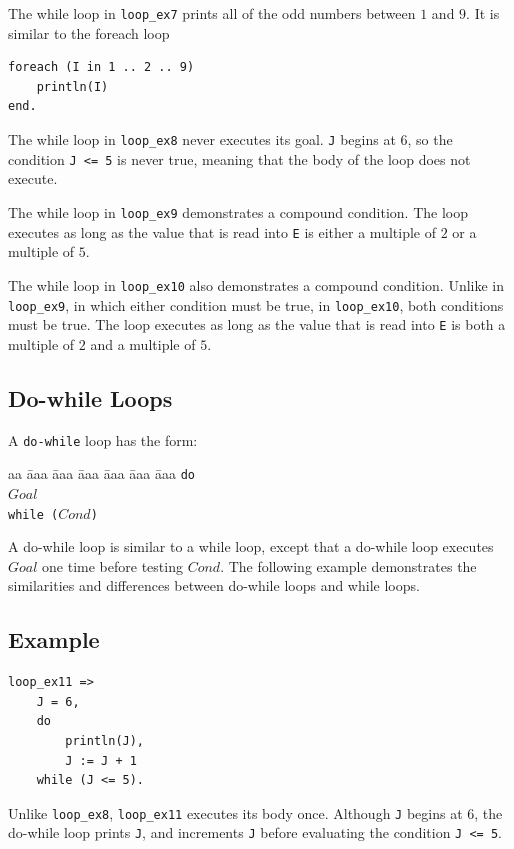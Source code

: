The while loop in \texttt{loop\_ex7} prints all of the odd numbers between $1$ and $9$.  It is similar to the foreach loop
\begin{verbatim}
foreach (I in 1 .. 2 .. 9)
    println(I)
end.
\end{verbatim}

The while loop in \texttt{loop\_ex8} never executes its goal.  \texttt{J} begins at $6$, so the condition \texttt{J <= 5} is never true, meaning that the body of the loop does not execute.

The while loop in \texttt{loop\_ex9} demonstrates a compound condition.  The loop executes as long as the value that is read into \texttt{E} is either a multiple of $2$ or a multiple of $5$.

The while loop in \texttt{loop\_ex10} also demonstrates a compound condition.  Unlike in \newline \texttt{loop\_ex9}, in which either condition must be true, in \texttt{loop\_ex10}, both conditions must be true.  The loop executes as long as the value that is read into \texttt{E} is both a multiple of $2$ and a multiple of $5$. 

\subsection{Do-while Loops}
A \texttt{do-while} loop has the form:
\begin{tabbing}
aa \= aaa \= aaa \= aaa \= aaa \= aaa \= aaa \kill
\> \texttt{do} \\
\> \> $Goal$  \\
\>  \texttt{while ($Cond$)}
\end{tabbing} 
A do-while loop is similar to a while loop, except that a do-while loop executes $Goal$ one time before testing $Cond$.  The following example demonstrates the similarities and differences between do-while loops and while loops.
\subsection*{Example}
\begin{verbatim}
loop_ex11 =>
    J = 6,
    do
        println(J),
        J := J + 1
    while (J <= 5).
\end{verbatim}

Unlike \texttt{loop\_ex8}, \texttt{loop\_ex11} executes its body once.  Although \texttt{J} begins at $6$, the do-while loop prints \texttt{J}, and increments \texttt{J} before evaluating the condition \texttt{J <= 5}.

